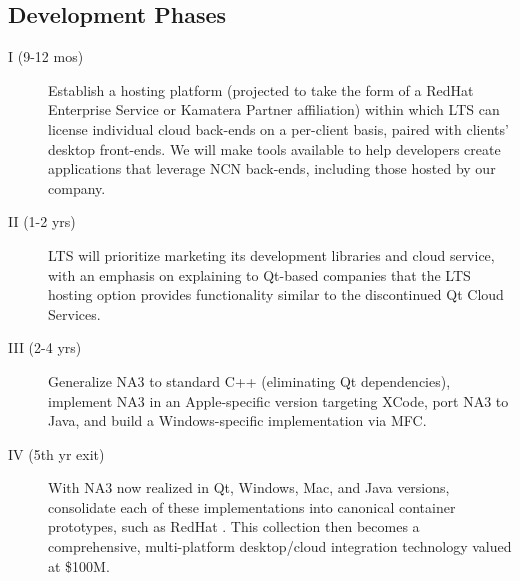 
\begin{frame}{}
\section{Development Phases}


\vspace{-.8em}



\hspace{20pt}\begin{minipage}{.996\textwidth}
{\fontsize{17}{23}\selectfont{}\selectfont \setlength{\leftmargini}{3pt}\begin{description}
\item[I (9-12 mos)] Establish a hosting platform 
(projected to take the form of a 
RedHat Enterprise Service or Kamatera Partner affiliation) within which 
LTS can license individual cloud back-ends 
on a per-client basis, paired with 
clients' desktop front-ends.  We will make tools 
available to help developers create applications 
that leverage NCN back-ends, including those hosted by 
our company.
\vspace{12pt}
\item[II (1-2 yrs)]  
LTS will prioritize marketing its development libraries 
and cloud service, 
with an emphasis on explaining to Qt-based 
companies that the LTS hosting option provides 
functionality similar to the discontinued 
Qt Cloud Services.   
\vspace{12pt}
\item[III (2-4 yrs)] Generalize NA3 to standard 
C++ (eliminating Qt dependencies),   
implement NA3 in an Apple-specific version 
targeting XCode, port NA3 to Java, and 
build a Windows-specific implementation 
via MFC.
\vspace{12pt}
\item[IV (5th yr exit)] With NA3 now realized 
in Qt, Windows, Mac, and Java versions, 
consolidate each of these implementations 
into canonical container prototypes, 
such as RedHat .  This 
collection then becomes 
a comprehensive, multi-platform 
desktop/cloud integration technology 
valued at \$100M.
\end{description}}\end{minipage}


\end{frame}
